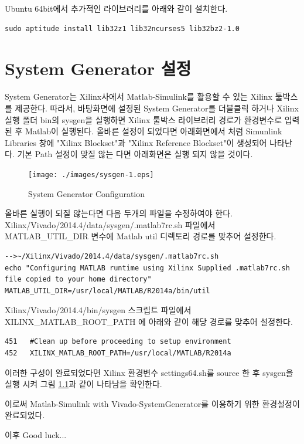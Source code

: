\documentclass[11pt
  , a4paper
  , article
  , oneside
]{memoir}
\begin{document}
Ubuntu 64bit에서 추가적인 라이브러리를 아래와 같이 설치한다.
\begin{lstlisting}[style=termstyle]
sudo aptitude install lib32z1 lib32ncurses5 lib32bz2-1.0
\end{lstlisting}


\chapter{System Generator 설정}
System Generator는 Xilinx사에서 Matlab-Simulink를 활용할 수 있는 Xilinx 툴박스를 제공한다. 따라서, 바탕화면에 설정된 System Generator를 더블클릭 하거나 Xilinx 실행 폴더 bin의 sysgen을 실행하면 Xilinx 툴박스 라이브러리 경로가 환경변수로 입력된 후 Matlab이 실행된다. 올바른 설정이 되었다면 아래화면에서 처럼 Simunlink Libraries 창에 "Xilinx Blockset"과 "Xilinx Reference Blockset"이 생성되어 나타난다. 기본 Path 설정이 맞질 않는 다면 아래화면은 실행 되지 않을 것이다.

\begin{figure}[h!]
	\centering
	\texttt{[image: ./images/sysgen-1.eps]}
	\caption{System Generator Configuration}
	\label{fig:sysgen_1} 
\end{figure}

올바른 실행이 되질 않는다면 다음 두개의 파일을 수정하여야 한다. \\
Xilinx/Vivado/2014.4/data/sysgen/.matlab7rc.sh 파일에서  MATLAB\_UTIL\_DIR 변수에 Matlab util 디렉토리 경로를 맞추어 설정한다.
\begin{lstlisting}[style=termstyle]
-->~/Xilinx/Vivado/2014.4/data/sysgen/.matlab7rc.sh
echo "Configuring MATLAB runtime using Xilinx Supplied .matlab7rc.sh file copied to your home directory"
MATLAB_UTIL_DIR=/usr/local/MATLAB/R2014a/bin/util
\end{lstlisting}

Xilinx/Vivado/2014.4/bin/sysgen 스크립트 파일에서 XILINX\_MATLAB\_ROOT\_PATH 에 아래와 같이 해당 경로를 맞추어 설정한다.

\begin{lstlisting}[style=termstyle]
451   #Clean up before proceeding to setup environment
452   XILINX_MATLAB_ROOT_PATH=/usr/local/MATLAB/R2014a
\end{lstlisting}

이러한 구성이 완료되었다면 Xilinx 환경변수 settings64.sh를 source 한 후 sysgen을 실행 시켜 그림 \ref{fig:sysgen_1}과 같이 나타남을 확인한다.

이로써 Matlab-Simulink with Vivado-SystemGenerator를 이용하기 위한 환경설정이 완료되었다.

이후 Good luck...




\end{document}
